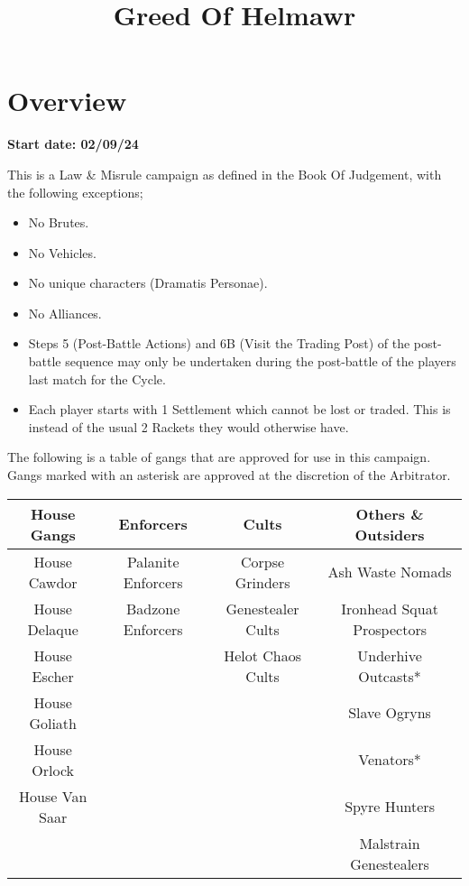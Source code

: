 \documentclass[a4paper]{article}
\title{Greed Of Helmawr}
\author{}
\date{}
\begin{document}
	\maketitle
	\section*{Overview}
	\textbf{Start date: 02/09/24}

	This is a Law \& Misrule campaign as defined in the Book Of Judgement, with the following exceptions;
	\begin{itemize}
		\item No Brutes.
		\item No Vehicles.
		\item No unique characters (Dramatis Personae).
		\item No Alliances.
		\item Steps 5 (Post-Battle Actions) and 6B (Visit the Trading Post) of the post-battle sequence may only be undertaken during the post-battle of the players last match for the Cycle.
		\item Each player starts with 1 Settlement which cannot be lost or traded. This is instead of the usual 2 Rackets they would otherwise have.
	\end{itemize}
	The following is a table of gangs that are approved for use in this campaign. Gangs marked with an asterisk are approved at the discretion of the Arbitrator.


	\begin{tabular}{c c c c}
		House Gangs    & Enforcers          & Cults             & Others \& Outsiders        \\
		\hline
		\rule{0pt}{3ex}
		House Cawdor   	& Palanite Enforcers & Corpse Grinders   & Ash Waste Nomads           \\
		House Delaque  	& Badzone Enforcers  & Genestealer Cults & Ironhead Squat Prospectors \\
		House Escher   	&                    & Helot Chaos Cults & Underhive Outcasts*        \\
		House Goliath  	&                    &                   & Slave Ogryns               \\
		House Orlock   	&                    &                   & Venators*                  \\
		House Van Saar 	&                    &                   & Spyre Hunters              \\
						&                    &                   & Malstrain Genestealers
	\end{tabular}
	\pagebreak
\end{document}
